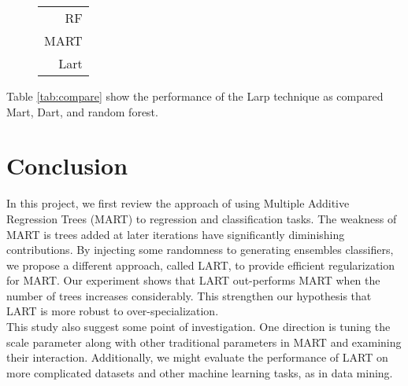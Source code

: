 \documentclass{article} %
\begin{document}
\begin{figure}	\centering
	\begin{tabular}{|r|}
 \hline
 
 \hline
               RF \\
               MART \\
               Lart \\\hline
	\end{tabular} 	
	\caption{ }
\end{figure}



Table \ref{tab:compare} show the performance of the Larp technique as compared Mart, Dart, and random forest.

\section{Conclusion}
In this project, we first review the approach of using Multiple Additive Regression Trees (MART) to regression and classification tasks. The weakness of MART is trees added at later iterations have significantly diminishing contributions. By injecting some randomness to generating ensembles classifiers, we propose a different approach, called LART, to provide efficient regularization for MART. Our experiment shows that LART out-performs MART when the number of trees increases considerably. This strengthen our hypothesis that LART is more robust to over-specialization.\\

This study also suggest some point of investigation. One direction is tuning the scale parameter along with other traditional parameters in MART and examining their interaction. Additionally, we might evaluate the performance of LART on more complicated datasets and other machine learning tasks, as in data mining.



\nocite{*}


\end{document}
